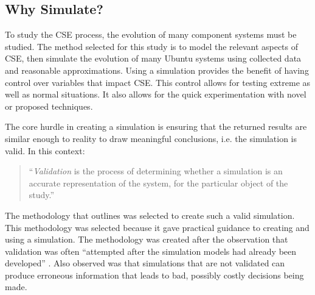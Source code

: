 \subsection{Why Simulate?}
To study the CSE process, the evolution of many component systems must be studied.
The method selected for this study is to model the relevant aspects of CSE, then simulate the evolution of many Ubuntu systems using collected data and reasonable approximations.
Using a simulation provides the benefit of having control over variables that impact CSE.
This control allows for testing extreme as well as normal situations.
It also allows for the quick experimentation with novel or proposed techniques.

The core hurdle in creating a simulation is ensuring that the returned results are similar enough to reality to draw meaningful conclusions, i.e. the simulation is valid.
In this context:
\begin{quotation}
``\textit{Validation} is the process of determining whether a simulation is an accurate representation of the system, for the particular object of the study.'' \citep{Law2005}
\end{quotation}

The methodology that \cite{Law2005} outlines was selected to create such a valid simulation.
This methodology was selected because it gave practical guidance to creating and using a simulation.
The methodology was created after the observation that validation was often ``attempted after the simulation models had already been developed'' \citep{Law2005}.
Also observed was that simulations that are not validated can produce erroneous information that leads to bad, possibly costly decisions being made.

